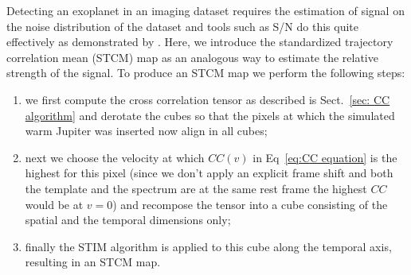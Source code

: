 \documentclass{aa}
\begin{document}
Detecting an exoplanet in an imaging dataset requires the estimation of signal on the noise distribution of the dataset and tools such as S/N do this quite effectively as demonstrated by \citet{2014MawetSNR}.
Here, we introduce the standardized trajectory correlation mean (STCM) map as an analogous way to estimate the relative strength of the signal. To produce an STCM map we perform the following steps:
\begin{enumerate}
    \item we first compute the cross correlation tensor as described is Sect.~\ref{sec: CC algorithm} and derotate the cubes so that the pixels at which the simulated warm Jupiter was inserted now align in all cubes;
    \item next we choose the velocity at which $CC(v)$ in Eq~\ref{eq:CC equation} is the highest for this pixel (since we don't apply an explicit frame shift and both the template and the spectrum are at the same rest frame the highest $CC$ would be at $v=0$) and recompose the tensor into a cube consisting of the spatial and the temporal dimensions only;
    \item finally the STIM algorithm is applied to this cube along the temporal axis, resulting in an STCM map.
\end{enumerate}
\end{document}

